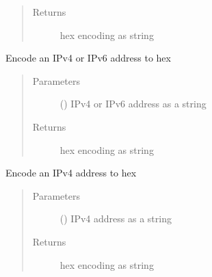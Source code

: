 \documentclass[letterpaper,10pt,english]{sphinxmanual}
\begin{document}
\begin{fulllineitems}
\begin{fulllineitems}
\begin{quote}
\begin{description}
\item[{Returns}] \leavevmode
\sphinxAtStartPar
hex encoding as string

\end{description}\end{quote}

\end{fulllineitems}


\begin{fulllineitems}
\label{\detokenize{dhcp_encode-class:bloxone.dhcp_encode.ip_to_hex}}
\sphinxAtStartPar
Encode an IPv4 or IPv6 address to hex
\begin{quote}\begin{description}
\item[{Parameters}] \leavevmode
\sphinxAtStartPar
{} () \textendash{} IPv4 or IPv6 address as a string

\item[{Returns}] \leavevmode
\sphinxAtStartPar
hex encoding as string

\end{description}\end{quote}

\end{fulllineitems}


\begin{fulllineitems}
\label{\detokenize{dhcp_encode-class:bloxone.dhcp_encode.ipv4_address_to_hex}}
\sphinxAtStartPar
Encode an IPv4 address to hex
\begin{quote}\begin{description}
\item[{Parameters}] \leavevmode
\sphinxAtStartPar
{} () \textendash{} IPv4 address as a string

\item[{Returns}] \leavevmode
\sphinxAtStartPar
hex encoding as string


\end{description}
\end{quote}
\end{fulllineitems}
\end{fulllineitems}
\end{document}
